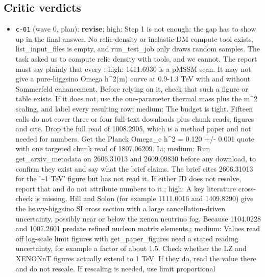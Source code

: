 \documentclass[11pt,a4paper]{article}
\begin{document}
\subsection{Critic verdicts}
\begin{itemize}
  \item \texttt{c-01} (wave 0, plan): \textbf{revise}; high: Step 1 is not enough: the gap has to show up in the final answer. No relic-density or inelastic-DM compute tool exists, list\_input\_files is empty, and run\_test\_job only draws random samples. The task asked us to compute relic density with tools, and we cannot. The report must say plainly that every ; high: 1411.6930 is a pMSSM scan. It may not give a pure-higgsino Omega h\textasciicircum{}2(m) curve at 0.9-1.3 TeV with and without Sommerfeld enhancement. Before relying on it, check that such a figure or table exists. If it does not, use the one-parameter thermal mass plus the m\textasciicircum{}2 scaling, and label every resulting row; medium: The budget is tight. Fifteen calls do not cover three or four full-text downloads plus chunk reads, figures and cite. Drop the full read of 1008.2905, which is a method paper and not needed for numbers. Get the Planck Omega\_c h\textasciicircum{}2 = 0.120 +/- 0.001 quote with one targeted chunk read of 1807.06209. Li; medium: Run get\_arxiv\_metadata on 2606.31013 and 2609.09830 before any download, to confirm they exist and say what the brief claims. The brief cites 2606.31013 for the '\textasciitilde{}1 TeV' figure but has not read it. If either ID does not resolve, report that and do not attribute numbers to it.; high: A key literature cross-check is missing. Hill and Solon (for example 1111.0016 and 1409.8290) give the heavy-higgsino SI cross section with a large cancellation-driven uncertainty, possibly near or below the xenon neutrino fog. Because 1104.0228 and 1007.2601 predate refined nucleon matrix elements,; medium: Values read off log-scale limit figures with get\_paper\_figures need a stated reading uncertainty, for example a factor of about 1.5. Check whether the LZ and XENONnT figures actually extend to 1 TeV. If they do, read the value there and do not rescale. If rescaling is needed, use limit proportional 

\end{itemize}
\end{document}
